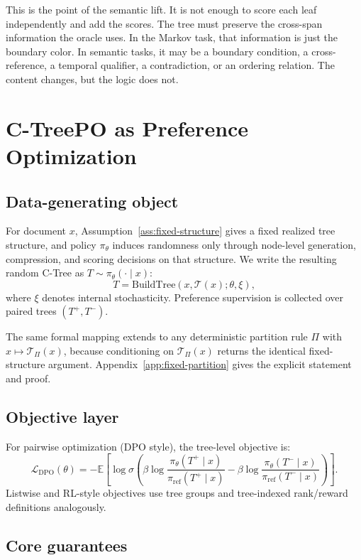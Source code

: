 \documentclass[11pt]{article}
\newcommand{\E}{\mathbb{E}}
\begin{document}
This is the point of the semantic lift. It is not enough to score each leaf independently and add the scores. The tree must preserve the cross-span information the oracle uses. In the Markov task, that information is just the boundary color. In semantic tasks, it may be a boundary condition, a cross-reference, a temporal qualifier, a contradiction, or an ordering relation. The content changes, but the logic does not.

\section{C-TreePO as Preference Optimization}\label{sec:po-mapping}

\subsection{Data-generating object}

For document $x$, Assumption~\ref{ass:fixed-structure} gives a fixed realized tree structure, and policy $\pi_\theta$ induces randomness only through node-level generation, compression, and scoring decisions on that structure. We write the resulting random C-Tree as $T\sim\pi_\theta(\cdot\mid x)$:
\[
T = \mathrm{BuildTree}(x,\mathcal{T}(x);\theta,\xi),
\]
where $\xi$ denotes internal stochasticity. Preference supervision is collected over paired trees $(T^+,T^-)$.

The same formal mapping extends to any deterministic partition rule $\Pi$ with $x\mapsto\mathcal{T}_\Pi(x)$, because conditioning on $\mathcal{T}_\Pi(x)$ returns the identical fixed-structure argument. Appendix~\ref{app:fixed-partition} gives the explicit statement and proof.

\subsection{Objective layer}

For pairwise optimization (DPO style), the tree-level objective is:
\[
\mathcal{L}_{\mathrm{DPO}}(\theta)
= -\E\!\left[\log\sigma\!\left(
\beta\log\frac{\pi_\theta(T^+\mid x)}{\pi_{\mathrm{ref}}(T^+\mid x)}
-\beta\log\frac{\pi_\theta(T^-\mid x)}{\pi_{\mathrm{ref}}(T^-\mid x)}
\right)\right].
\]
Listwise and RL-style objectives use tree groups and tree-indexed rank/reward definitions analogously.

\subsection{Core guarantees}
\end{document}
